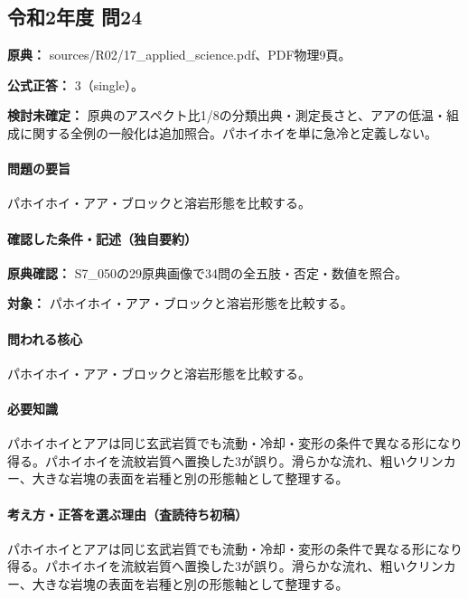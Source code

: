 \subsection{令和2年度 問24}
\label{q:r02-reg-applied-24}

\noindent\textbf{原典：} sources/R02/17\_applied\_science.pdf、PDF物理9頁。

\textbf{公式正答：} 3（single）。

\par\textbf{検討未確定：} 原典のアスペクト比1/8の分類出典・測定長さと、アアの低温・組成に関する全例の一般化は追加照合。パホイホイを単に急冷と定義しない。

\paragraph{問題の要旨} パホイホイ・アア・ブロックと溶岩形態を比較する。

\paragraph{確認した条件・記述（独自要約）}\mbox{}\par

\noindent\textbf{原典確認：} S7\_050の29原典画像で34問の全五肢・否定・数値を照合。\par

\noindent\textbf{対象：} パホイホイ・アア・ブロックと溶岩形態を比較する。\par

\paragraph{問われる核心} パホイホイ・アア・ブロックと溶岩形態を比較する。

\paragraph{必要知識} パホイホイとアアは同じ玄武岩質でも流動・冷却・変形の条件で異なる形になり得る。パホイホイを流紋岩質へ置換した3が誤り。滑らかな流れ、粗いクリンカー、大きな岩塊の表面を岩種と別の形態軸として整理する。

\paragraph{考え方・正答を選ぶ理由（査読待ち初稿）} パホイホイとアアは同じ玄武岩質でも流動・冷却・変形の条件で異なる形になり得る。パホイホイを流紋岩質へ置換した3が誤り。滑らかな流れ、粗いクリンカー、大きな岩塊の表面を岩種と別の形態軸として整理する。

